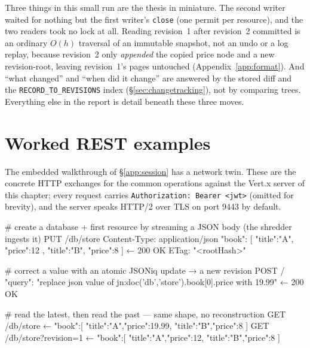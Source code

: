 \documentclass[11pt,a4paper,oneside]{report}
\newcommand{\dcap}[1]{\par\vspace{1pt}\noindent{\small\sffamily\bfseries\color{slate}#1}\par\vspace{-2pt}}
\theoremstyle{sirixthm}
\newcommand{\code}[1]{\texttt{#1}}
\begin{document}
Three things in this small run are the thesis in miniature. The second writer waited for nothing but the
first writer's \code{close} (one permit per resource), and the two readers took no lock at all. Reading
revision~1 after revision~2 committed is an ordinary $O(h)$ traversal of an immutable snapshot, not an
undo or a log replay, because revision~2 only \emph{appended} the copied price node and a new
revision-root, leaving revision~1's pages untouched (Appendix~\ref{app:format}). And ``what changed''
and ``when did it change'' are answered by the stored diff and the \code{RECORD\_TO\_REVISIONS} index
(\S\ref{sec:changetracking}), not by comparing trees. Everything else in the report is detail beneath
these three moves.

\section{Worked REST examples}
\label{app:restsessions}

The embedded walkthrough of \S\ref{app:session} has a network twin. These are the concrete
HTTP exchanges for the common operations against the Vert.x server of this chapter; every
request carries \code{Authorization: Bearer <jwt>} (omitted for brevity), and the server speaks HTTP/2
over TLS on port 9443 by default.

\dcap{Create, write, and read back over REST}
\begin{diagramS}
# create a database + first resource by streaming a JSON body (the shredder ingests it)
PUT /db/store        Content-Type: application/json
     { "book": [ { "title":"A", "price":12 }, { "title":"B", "price":8 } ] }
←  200 OK   ETag: "<rootHash>"

# correct a value with an atomic JSONiq update → a new revision
POST /
     { "query": "replace json value of jn:doc('db','store').book[0].price with 19.99" }
←  200 OK

# read the latest, then read the past — same shape, no reconstruction
GET  /db/store                       ←  { "book":[ {"title":"A","price":19.99}, {"title":"B","price":8} ] }
GET  /db/store?revision=1            ←  { "book":[ {"title":"A","price":12},    {"title":"B","price":8} ] }
\end{diagramS}
\end{document}
